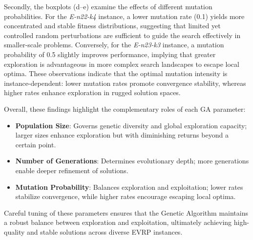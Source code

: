 Secondly, the boxplots (d–e) examine the effects of different mutation probabilities.  
For the \textit{E-n22-k4} instance, a lower mutation rate (0.1) yields more concentrated and stable fitness distributions, suggesting that limited yet controlled random perturbations are sufficient to guide the search effectively in smaller-scale problems.  
Conversely, for the \textit{E-n23-k3} instance, a mutation probability of 0.5 slightly improves performance, implying that greater exploration is advantageous in more complex search landscapes to escape local optima.  
These observations indicate that the optimal mutation intensity is instance-dependent: lower mutation rates promote convergence stability, whereas higher rates enhance exploration in rugged solution spaces.

Overall, these findings highlight the complementary roles of each GA parameter:

\begin{itemize}
    \item \textbf{Population Size}: Governs genetic diversity and global exploration capacity; larger sizes enhance exploration but with diminishing returns beyond a certain point.
    \item \textbf{Number of Generations}: Determines evolutionary depth; more generations enable deeper refinement of solutions.
    \item \textbf{Mutation Probability}: Balances exploration and exploitation; lower rates stabilize convergence, while higher rates encourage escaping local optima.
\end{itemize}

Careful tuning of these parameters ensures that the Genetic Algorithm maintains a robust balance between exploration and exploitation, ultimately achieving high-quality and stable solutions across diverse EVRP instances.

